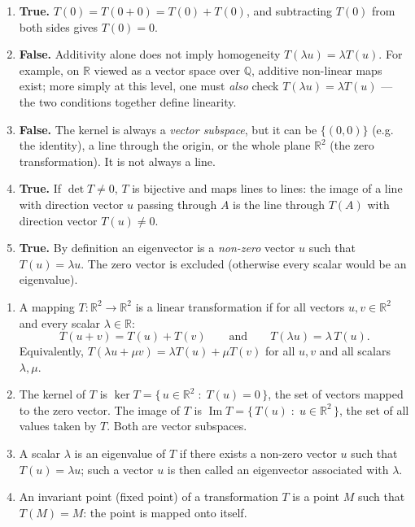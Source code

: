 \documentclass[11pt]{article}
\newcommand{\cle}[1]{{\popxbold\color{popdark}#1}}
\begin{document}
\begin{corrige}
\begin{enumerate}
\item \textbf{True.} $T(0)=T(0+0)=T(0)+T(0)$, and subtracting $T(0)$ from both sides gives $T(0)=0$.
\item \textbf{False.} Additivity alone does not imply homogeneity $T(\lambda u)=\lambda T(u)$. For example, on $\mathbb{R}$ viewed as a vector space over $\mathbb{Q}$, additive non-linear maps exist; more simply at this level, one must \emph{also} check $T(\lambda u)=\lambda T(u)$ — the two conditions together define linearity.
\item \textbf{False.} The kernel is always a \emph{vector subspace}, but it can be $\{(0,0)\}$ (e.g. the identity), a line through the origin, or the whole plane $\mathbb{R}^{2}$ (the zero transformation). It is not always a line.
\item \textbf{True.} If $\det T\neq 0$, $T$ is bijective and maps lines to lines: the image of a line with direction vector $u$ passing through $A$ is the line through $T(A)$ with direction vector $T(u)\neq 0$.
\item \textbf{True.} By definition an eigenvector is a \emph{non-zero} vector $u$ such that $T(u)=\lambda u$. The zero vector is excluded (otherwise every scalar would be an eigenvalue).
\end{enumerate}
\end{corrige}

\begin{corrige}
\begin{enumerate}
\item A mapping $T:\mathbb{R}^{2}\to\mathbb{R}^{2}$ is a \cle{linear transformation} if for all vectors $u,v\in\mathbb{R}^{2}$ and every scalar $\lambda\in\mathbb{R}$:
\[ T(u+v)=T(u)+T(v)\qquad\text{and}\qquad T(\lambda u)=\lambda\,T(u). \]
Equivalently, $T(\lambda u+\mu v)=\lambda T(u)+\mu T(v)$ for all $u,v$ and all scalars $\lambda,\mu$.
\item The \cle{kernel} of $T$ is $\ker T=\{\,u\in\mathbb{R}^{2}\;:\;T(u)=0\,\}$, the set of vectors mapped to the zero vector. The \cle{image} of $T$ is $\operatorname{Im}T=\{\,T(u)\;:\;u\in\mathbb{R}^{2}\,\}$, the set of all values taken by $T$. Both are vector subspaces.
\item A scalar $\lambda$ is an \cle{eigenvalue} of $T$ if there exists a non-zero vector $u$ such that $T(u)=\lambda u$; such a vector $u$ is then called an \cle{eigenvector} associated with $\lambda$.
\item An \cle{invariant point} (fixed point) of a transformation $T$ is a point $M$ such that $T(M)=M$: the point is mapped onto itself.
\end{enumerate}
\end{corrige}
\end{document}
